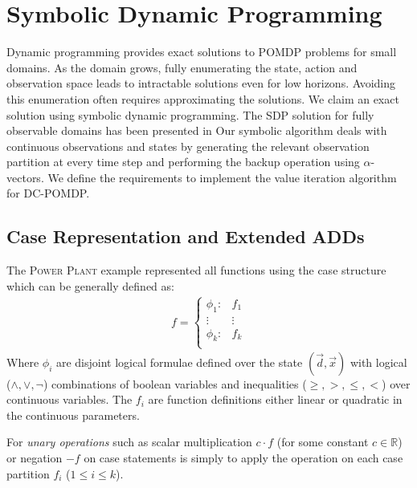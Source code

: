 \documentclass{article} %
\begin{document}
\section{Symbolic Dynamic Programming} 
Dynamic programming provides exact solutions to POMDP problems for small domains. As the domain grows, fully enumerating the state, action and observation space leads to intractable solutions even for low horizons. Avoiding this enumeration often requires approximating the solutions. We claim an exact solution using symbolic dynamic programming. The SDP solution for fully observable domains has been presented in \cite{sanner_uai11} %
Our symbolic algorithm deals with continuous observations and states by generating the relevant observation partition at every time step and performing the backup operation using $\alpha$-vectors. We define the requirements to implement the value iteration algorithm for DC-POMDP. 

\subsection{Case Representation and Extended ADDs}
The \textsc{Power Plant} example represented all functions using the case structure which can be generally defined as:
{%
\begin{align}
f = 
\begin{cases}
  \phi_1: & f_1 \\ 
 \vdots&\vdots\\ 
  \phi_k: & f_k \\ 
\end{cases} \nonumber
\end{align}
}
Where $\phi_i$ are disjoint logical formulae defined over the state $(\vec{d},\vec{x})$ with logical ($\land,\lor,\neg$) combinations of boolean variables and inequalities ($\geq,>,\leq,<$) over continuous variables.  
The $f_i$ are function definitions either linear or quadratic in the continuous parameters. 

For \emph{unary operations} such as scalar multiplication $c\cdot f$ (for some constant $c \in \mathbb{R}$) or negation $-f$ on case statements is simply to apply the operation on each case partition $f_i$ ($1 \leq i \leq k$). 
\end{document}
